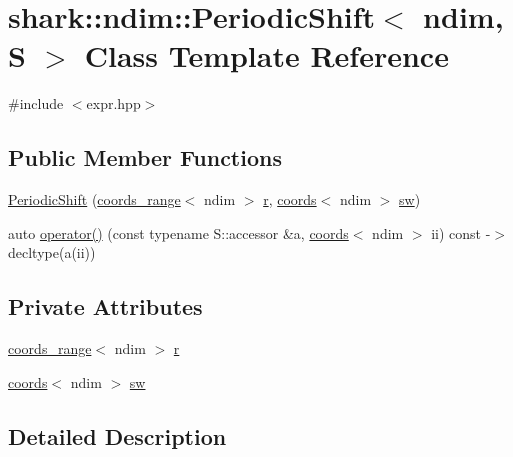 \hypertarget{classshark_1_1ndim_1_1_periodic_shift}{}\section{shark\+:\+:ndim\+:\+:Periodic\+Shift$<$ ndim, S $>$ Class Template Reference}
\label{classshark_1_1ndim_1_1_periodic_shift}


{\ttfamily \#include $<$expr.\+hpp$>$}

\subsection*{Public Member Functions}
\begin{DoxyCompactItemize}
\item 
\hyperlink{classshark_1_1ndim_1_1_periodic_shift_aceef16e1e0671276f46277d219386d68}{Periodic\+Shift} (\hyperlink{structshark_1_1ndim_1_1coords__range}{coords\+\_\+range}$<$ ndim $>$ \hyperlink{classshark_1_1ndim_1_1_periodic_shift_ad2b058280d2b466c8acb82e6f473e240}{r}, \hyperlink{structshark_1_1ndim_1_1coords}{coords}$<$ ndim $>$ \hyperlink{classshark_1_1ndim_1_1_periodic_shift_aded04c5bc0760cfb247590c85921b653}{sw})
\item 
auto \hyperlink{classshark_1_1ndim_1_1_periodic_shift_acc2d3268c34e15655301843e4370a349}{operator()} (const typename S\+::accessor \&a, \hyperlink{structshark_1_1ndim_1_1coords}{coords}$<$ ndim $>$ ii) const -\/$>$ decltype(a(ii))
\end{DoxyCompactItemize}
\subsection*{Private Attributes}
\begin{DoxyCompactItemize}
\item 
\hyperlink{structshark_1_1ndim_1_1coords__range}{coords\+\_\+range}$<$ ndim $>$ \hyperlink{classshark_1_1ndim_1_1_periodic_shift_ad2b058280d2b466c8acb82e6f473e240}{r}
\item 
\hyperlink{structshark_1_1ndim_1_1coords}{coords}$<$ ndim $>$ \hyperlink{classshark_1_1ndim_1_1_periodic_shift_aded04c5bc0760cfb247590c85921b653}{sw}
\end{DoxyCompactItemize}


\subsection{Detailed Description}
